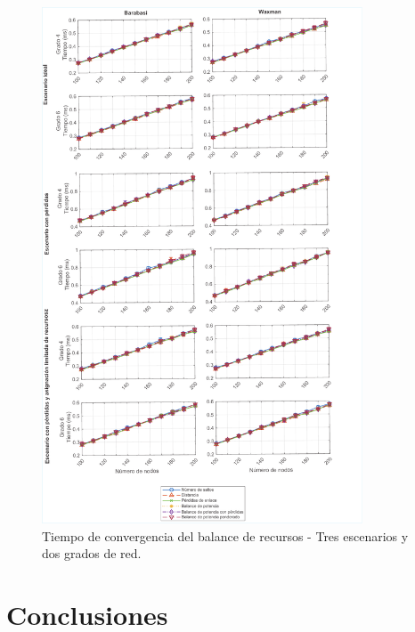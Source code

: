 \begin{figure}[H]
    \centering
    \includegraphics[width=0.85\textwidth]{fig/05_den2ne/den2ne_20.pdf}
    \caption{Tiempo de convergencia del balance de recursos - Tres escenarios y dos grados de red.}
    \label{fig:f3}
\end{figure}

\section{Conclusiones}


